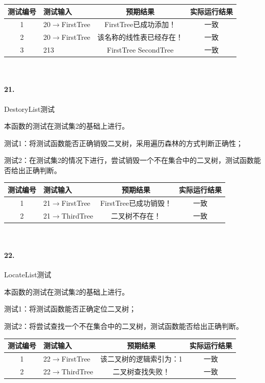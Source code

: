 \documentclass[supercite]{Experimental_Report}
\theoremstyle{definition}
\begin{document}
\begin{tabular}{|c|p{2.7cm}|c|c|}
	\hline
	测试编号 & 测试输入 & 预期结果 & 实际运行结果 \\
	\hline
	1 & 20$\rightarrow$FirstTree & FirstTree已成功添加！ & 一致 \\
	\hline
	2 & 20$\rightarrow$FirstTree & 该名称的线性表已经存在！ & 一致 \\
	\hline
	3 & 213& FirstTree SecondTree & 一致 \\
	\hline
\end{tabular}

~\

\paragraph{21.}DestoryList测试

本函数的测试在测试集2的基础上进行。

测试1：将测试函数能否正确销毁二叉树，采用遍历森林的方式判断正确性；

测试2：在测试集2的情况下进行，尝试销毁一个不在集合中的二叉树，测试函数能否给出正确判断。

\vspace{0.5em}

\begin{tabular}{|c|p{2.7cm}|c|c|}
	\hline
	测试编号 & 测试输入 & 预期结果 & 实际运行结果 \\
	\hline
	1 & 21$\rightarrow$FirstTree & FirstTree已成功销毁！ & 一致 \\
	\hline
	2 & 21$\rightarrow$ThirdTree & 二叉树不存在！ & 一致 \\
	\hline
\end{tabular}

~\

\paragraph{22.}LocateList测试
	
本函数的测试在测试集2的基础上进行。

测试1：将测试函数能否正确定位二叉树；

测试2：将尝试查找一个不在集合中的二叉树，测试函数能否给出正确判断。

\vspace{0.5em}

\begin{tabular}{|c|p{2.7cm}|c|c|}
	\hline
	测试编号 & 测试输入 & 预期结果 & 实际运行结果 \\
	\hline
	1 & 22$\rightarrow$FirstTree & 该二叉树的逻辑索引为：1 & 一致 \\
	\hline
	2 & 22$\rightarrow$ThirdTree & 二叉树查找失败！ & 一致 \\
	\hline
\end{tabular}
\end{document}

